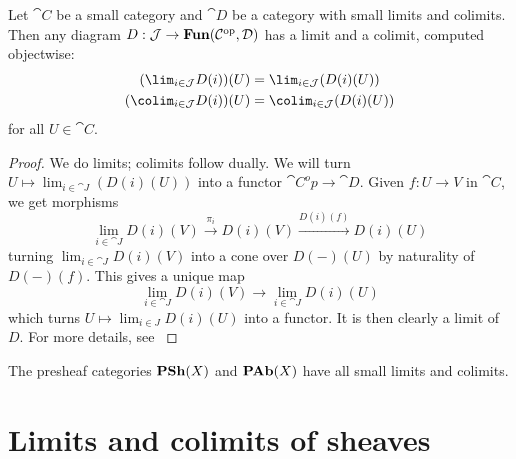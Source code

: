 \documentclass[../main.tex]{subfiles}
\begin{document}
\begin{lem}
	Let $\cat C$ be a small category and $\cat D$ be a category with small limits and colimits.
	Then any diagram $D: \mathcal{J} \to \operatorname{\mathbf{Fun}}(\mathcal{C}^{\mathrm{op}}, \mathcal{D})$ has a limit and a colimit, computed objectwise:
	\begin{align*}
    	(\lim_{i\in \cat J}D(i))(U) &= \lim_{i \in \cat J}(D(i)(U))\\
    	(\colim_{i\in \cat J}D(i))(U) &= \colim_{i \in \cat J}(D(i)(U))
    \end{align*} for all $U \in \cat C$.

\end{lem}
\begin{proof}
    We do limits; colimits follow dually. We will turn $U \mapsto \lim_{i \in \cat J}(D(i)(U))$ into a functor $\cat C^op \to \cat D$. Given $f: U \to V$ in $\cat C$, we get morphisms 
    \[
        \lim_{i \in \cat J} D(i)(V) \xrightarrow{\pi_i} D(i)(V) \xrightarrow{D(i)(f)} D(i)(U)
    \] turning $\lim_{i \in \cat J} D(i)(V)$ into a cone over $D(-)(U)$ by naturality of $D(-)(f)$. This gives a unique map \[
        \lim_{i \in \cat J} D(i)(V) \to \lim_{i \in \cat J} D(i)(U)
    \] which turns $U \mapsto \lim_{i \in J} D(i)(U)$ into a functor. It is then clearly a limit of $D$. For more details, see \cite[Chapter~5.3]{maclane:71}
\end{proof}

\begin{cor}
	The presheaf categories $\operatorname{\mathbf{PSh}}(X)$ and $\operatorname{\mathbf{PAb}}(X)$ have all small limits and colimits.
\end{cor}

\section{Limits and colimits of sheaves}
\end{document}
